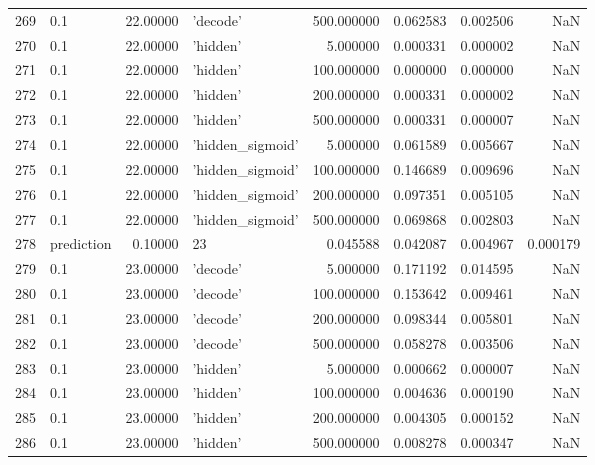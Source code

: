 \documentclass[10pt,a4paper]{article}
\begin{document}
\begin{tabular}{llrlrrrr}
269  &         0.1 &  22.00000 &           'decode' &  500.000000 &  0.062583 &  0.002506 &       NaN \\
270  &         0.1 &  22.00000 &           'hidden' &    5.000000 &  0.000331 &  0.000002 &       NaN \\
271  &         0.1 &  22.00000 &           'hidden' &  100.000000 &  0.000000 &  0.000000 &       NaN \\
272  &         0.1 &  22.00000 &           'hidden' &  200.000000 &  0.000331 &  0.000002 &       NaN \\
273  &         0.1 &  22.00000 &           'hidden' &  500.000000 &  0.000331 &  0.000007 &       NaN \\
274  &         0.1 &  22.00000 &   'hidden\_sigmoid' &    5.000000 &  0.061589 &  0.005667 &       NaN \\
275  &         0.1 &  22.00000 &   'hidden\_sigmoid' &  100.000000 &  0.146689 &  0.009696 &       NaN \\
276  &         0.1 &  22.00000 &   'hidden\_sigmoid' &  200.000000 &  0.097351 &  0.005105 &       NaN \\
277  &         0.1 &  22.00000 &   'hidden\_sigmoid' &  500.000000 &  0.069868 &  0.002803 &       NaN \\
278  &  prediction &   0.10000 &                 23 &    0.045588 &  0.042087 &  0.004967 &  0.000179 \\
279  &         0.1 &  23.00000 &           'decode' &    5.000000 &  0.171192 &  0.014595 &       NaN \\
280  &         0.1 &  23.00000 &           'decode' &  100.000000 &  0.153642 &  0.009461 &       NaN \\
281  &         0.1 &  23.00000 &           'decode' &  200.000000 &  0.098344 &  0.005801 &       NaN \\
282  &         0.1 &  23.00000 &           'decode' &  500.000000 &  0.058278 &  0.003506 &       NaN \\
283  &         0.1 &  23.00000 &           'hidden' &    5.000000 &  0.000662 &  0.000007 &       NaN \\
284  &         0.1 &  23.00000 &           'hidden' &  100.000000 &  0.004636 &  0.000190 &       NaN \\
285  &         0.1 &  23.00000 &           'hidden' &  200.000000 &  0.004305 &  0.000152 &       NaN \\
286  &         0.1 &  23.00000 &           'hidden' &  500.000000 &  0.008278 &  0.000347 &       NaN \\

\end{tabular}
\end{document}
